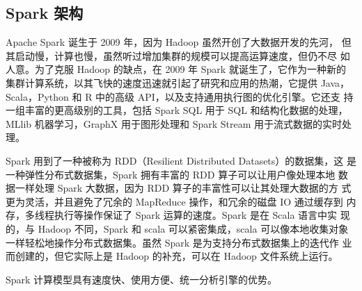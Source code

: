 \documentclass[UTF8,a4paper,10pt,nocolorlinks]{ctexart}
\begin{document}
\subsection{Spark 架构}
Apache Spark 诞生于 2009 年，因为 Hadoop 虽然开创了大数据开发的先河，
但其启动慢，计算也慢，虽然听过增加集群的规模可以提高运算速度，但仍不尽
如人意。为了克服 Hadoop 的缺点，在 2009 年 Spark 就诞生了，它作为一种新的
集群计算系统，以其飞快的速度迅速就引起了研究和应用的热潮，它提供 Java，
Scala，Python 和 R 中的高级 API，以及支持通用执行图的优化引擎。它还支
持一组丰富的更高级别的工具，包括 Spark SQL 用于 SQL 和结构化数据的处理，
MLlib 机器学习，GraphX 用于图形处理和 Spark  Stream 用于流式数据的实时处
理。\par
Spark 用到了一种被称为 RDD（Resilient Distributed Datasets）的数据集，这
是一种弹性分布式数据集，Spark 拥有丰富的 RDD 算子可以让用户像处理本地
数据一样处理 Spark 大数据，因为 RDD 算子的丰富性可以让其处理大数据的方
式更为灵活，并且避免了冗余的 MapReduce 操作，和冗余的磁盘 IO 通过缓存到
内存，多线程执行等操作保证了 Spark 运算的速度。Spark  是在  Scala  语言中实
现的，与 Hadoop 不同，Spark 和 scala 可以紧密集成，scala 可以像本地收集对象
一样轻松地操作分布式数据集。虽然 Spark 是为支持分布式数据集上的迭代作
业而创建的，但它实际上是 Hadoop 的补充，可以在 Hadoop 文件系统上运行。
\par Spark 计算模型具有速度快、使用方便、统一分析引擎的优势。
\end{document}
